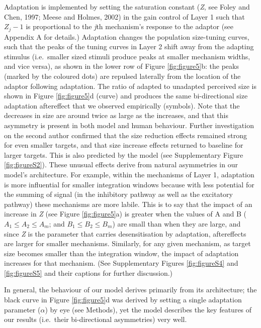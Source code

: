 \documentclass[
]{article}
\begin{document}
Adaptation is implemented by setting the saturation constant (\emph{Z}, see Foley and Chen, 1997; Meese and Holmes, 2002) in the gain control of Layer 1 such that \(Z_j-1\) is proportional to the \emph{j}th mechanism's response to the adaptor (see Appendix A for details.) Adaptation changes the population size-tuning curves, such that the peaks of the tuning curves in Layer 2 shift away from the adapting stimulus (i.e.~smaller sized stimuli produce peaks at smaller mechanism widths, and vice versa), as shown in the lower row of Figure \ref{fig:figure5}b: the peaks (marked by the coloured dots) are repulsed laterally from the location of the adaptor following adaptation. The ratio of adapted to unadapted perceived size is shown in Figure \ref{fig:figure5}d (curve) and produces the same bi-directional size adaptation aftereffect that we observed empirically (symbols). Note that the decreases in size are around twice as large as the increases, and that this asymmetry is present in both model and human behaviour. Further investigation on the second author confirmed that the size reduction effects remained strong for even smaller targets, and that size increase effects returned to baseline for larger targets. This is also predicted by the model (see Supplementary Figure \ref{fig:figureS2}). These unusual effects derive from natural asymmetries in our model's architecture. For example, within the mechanisms of Layer 1, adaptation is more influential for smaller integration windows because with less potential for the summing of signal (in the inhibitory pathway as well as the excitatory pathway) these mechanisms are more labile. This is to say that the impact of an increase in \emph{Z} (see Figure \ref{fig:figure5}a) is greater when the values of A and B (\(A_1 \le A_2 \le A_m\); and \(B_1 \le B_2 \le B_m\)) are small than when they are large, and since \emph{Z} is the parameter that carries desensitisation by adaptation, aftereffects are larger for smaller mechanisms. Similarly, for any given mechanism, as target size becomes smaller than the integration window, the impact of adaptation increases for that mechanism. (See Supplementary Figures \ref{fig:figureS4} and \ref{fig:figureS5} and their captions for further discussion.)

In general, the behaviour of our model derives primarily from its architecture; the black curve in Figure \ref{fig:figure5}d was derived by setting a single adaptation parameter (\(\alpha\)) by eye (see Methods), yet the model describes the key features of our results (i.e.~their bi-directional asymmetries) very well.
\end{document}
